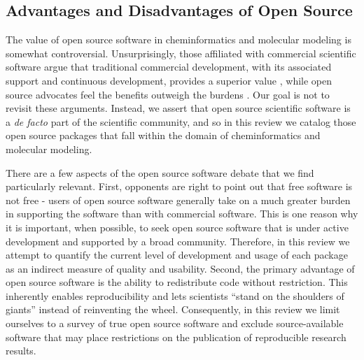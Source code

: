 \subsection*{Advantages and Disadvantages of Open Source}

The value of open source software in cheminformatics and molecular modeling is somewhat controversial.  Unsurprisingly, those affiliated with commercial scientific software argue that traditional commercial development, with its associated support and continuous development, provides a superior value \cite{Krylov_2015}, while open source advocates feel the benefits outweigh the burdens \cite{Gezelter_2015,Jacob_2016}. Our goal is not to revisit these arguments.  Instead, we assert that open source scientific software is a \textit{de facto} part of the scientific community, and so in this review we catalog those open source packages that fall within the domain of cheminformatics and molecular modeling.

There are a few aspects of the open source software debate that we find particularly relevant.  First, opponents are right to point out that free software is not free - users of open source software generally take on a much greater burden in supporting the software than with commercial software.  This is one reason why it is important, when possible, to seek open source software that is under active development and supported by a broad community.  Therefore, in this review we attempt to quantify the current level of development and usage of each package as an indirect measure of quality and usability.  Second, the primary advantage of open source software is the ability to redistribute code without restriction.  This inherently enables reproducibility and lets scientists ``stand on the shoulders of giants'' instead of reinventing the wheel. Consequently, in this review we limit ourselves to a survey of true open source software and exclude source-available software that may place restrictions on the publication of reproducible research results. 


